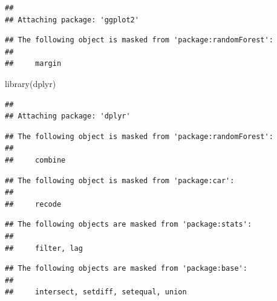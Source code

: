 \documentclass[
]{article}
\newenvironment{Shaded}{\begin{snugshade}}{\end{snugshade}}
\newcommand{\FunctionTok}[1]{\textcolor[rgb]{0.00,0.00,0.00}{#1}}
\newcommand{\NormalTok}[1]{#1}
\begin{document}
\begin{verbatim}
## 
## Attaching package: 'ggplot2'
\end{verbatim}

\begin{verbatim}
## The following object is masked from 'package:randomForest':
## 
##     margin
\end{verbatim}

\begin{Shaded}
\begin{Highlighting}[]
\FunctionTok{library}\NormalTok{(dplyr)}
\end{Highlighting}
\end{Shaded}

\begin{verbatim}
## 
## Attaching package: 'dplyr'
\end{verbatim}

\begin{verbatim}
## The following object is masked from 'package:randomForest':
## 
##     combine
\end{verbatim}

\begin{verbatim}
## The following object is masked from 'package:car':
## 
##     recode
\end{verbatim}

\begin{verbatim}
## The following objects are masked from 'package:stats':
## 
##     filter, lag
\end{verbatim}

\begin{verbatim}
## The following objects are masked from 'package:base':
## 
##     intersect, setdiff, setequal, union
\end{verbatim}
\end{document}
